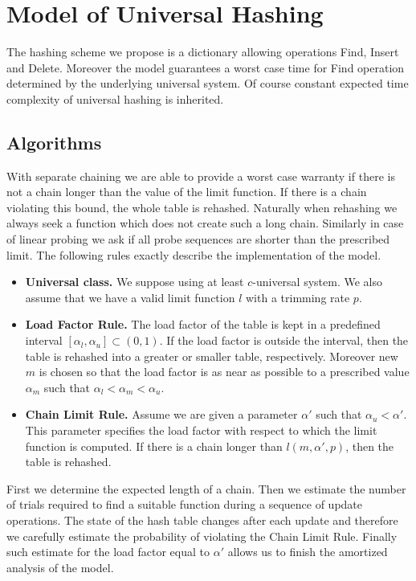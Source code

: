 \section{Model of Universal Hashing}
\label{section-model}
The hashing scheme we propose is a dictionary allowing operations Find, Insert and Delete. Moreover the model guarantees a worst case time for Find operation determined by the underlying universal system. Of course constant expected time complexity of universal hashing is inherited. 

\subsection{Algorithms}
With separate chaining we are able to provide a worst case warranty if there is not a chain longer than the value of the limit function. If there is a chain violating this bound, the whole table is rehashed. Naturally when rehashing we always seek a function which does not create such a long chain. Similarly in case of linear probing we ask if all probe sequences are shorter than the prescribed limit. The following rules exactly describe the implementation of the model.
\begin{itemize}
\item \textbf{Universal class.} We suppose using at least $c$-universal system. We also assume that we have a valid limit function $l$ with a trimming rate $p$.

\item \textbf{Load Factor Rule.} The load factor of the table is kept in a predefined interval $[\alpha_l, \alpha_u] \subset (0, 1)$. If the load factor is outside the interval, then the table is rehashed into a greater or smaller table, respectively. Moreover new $m$ is chosen so that the load factor is as near as possible to a prescribed value $\alpha_m$ such that $\alpha_l < \alpha_m < \alpha_u$. 

\item \textbf{Chain Limit Rule.} Assume we are given a parameter $\alpha'$ such that $\alpha_u < \alpha'$. This parameter specifies the load factor with respect to which the limit function is computed. If there is a chain longer than $l(m, \alpha', p)$, then the table is rehashed.
\end{itemize}

First we determine the expected length of a chain. Then we estimate the number of trials required to find a suitable function during a sequence of update operations. The state of the hash table changes after each update and therefore we carefully estimate the probability of violating the Chain Limit Rule. Finally such estimate for the load factor equal to $\alpha'$ allows us to finish the amortized analysis of the model.

